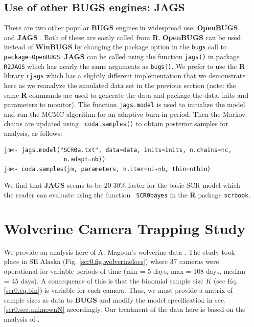 \subsection{Use of other BUGS engines: JAGS}

There are two other popular {\bf BUGS} engines in widespread use: {\bf
  OpenBUGS} \citep{thomas_etal:2006} and {\bf JAGS}
\citep{plummer:2003}. Both of these are easily called from {\bf
  R}. {\bf OpenBUGS} can be used instead of {\bf WinBUGS} by changing
the package option in the \mbox{\tt bugs} call to \mbox{\tt
  package=OpenBUGS}.  {\bf JAGS} can be called using the function
\mbox{\tt jags()} in package \mbox{\tt R2JAGS} which has nearly the
same arguments as \mbox{\tt bugs()}.  We prefer to use the {\bf R}
library \mbox{\tt rjags} \citep{plummer:2009} which has a slightly
different implementation that we demonstrate here as we reanalyze the
simulated data set in the previous section (note: the same {\bf R}
commands are used to generate the data and package the data, inits and
parameters to monitor). The function \mbox{\tt jags.model} is used to
initialize the model and run the MCMC algorithm for an adaptive
burn-in period.  Then the Markov chains are updated using \mbox{\tt
  coda.samples()} to obtain posterior samples for analysis, as
follows:
\begin{verbatim}
jm<- jags.model("SCR0a.txt", data=data, inits=inits, n.chains=nc,
                 n.adapt=nb))
jm<- coda.samples(jm, parameters, n.iter=ni-nb, thin=nthin)
\end{verbatim}
We find that {\bf JAGS} seems to be 20-30\% faster for the basic SCR
model which the reader can evaluate using the function \mbox{\tt
  SCR0bayes} in the {\bf R} package \mbox{\tt scrbook}.



\section{Wolverine Camera Trapping Study}
\label{scr0.sec.wolverine}

We provide an analysis here of A. Magoun's wolverine data
\citep{magoun_etal:2011, royle_etal:2011jwm}. The study took place in SE
Alaska (Fig. \ref{scr0.fig.wolverinelocs}) where 37 cameras were
operational for variable periods of time (min = 5 days, max = 108
days, median = 45 days).  A consequence of this is that the binomial
sample size $K$ (see Eq. \ref{scr0.eq.bin})
 is variable for each camera. Thus, we
must provide a matrix of sample sizes as data to {\bf BUGS} and modify the
model specification in sec. \ref{scr0.sec.unknownN}
accordingly. Our treatment of the
data here is based on the analysis of  \citet{royle_etal:2011jwm}.


